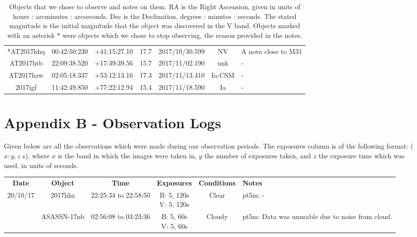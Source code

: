 \documentclass[twocolumn]{revtex4}
\begin{document}
{\begin{table}[h!]
\begin{tabularx}{\textwidth}{c c c c @{\hskip 5pt} c c X}
    *AT2017hhq & 00:42:50.230 & +41:15:27.10 & 17.7 & 2017/10/30.599 & NV & {A nova close to M31}  \\
    AT2017htb & 22:09:38.520 & +17:39:39.56 & 15.7 & 2017/11/02.190 & unk & {-}  \\
    AT2017hzw & 02:05:18.337 & +53:12:13.16 & 17.3 & 2017/11/13.410 & Ia-CSM & {-}  \\
    2017igf & 11:42:49.850 & +77:22:12.94 & 15.4 & 2017/11/18.590 & Ia & {-}  \\
    \hline      
\end{tabularx}
\caption{Objects that we chose to observe and notes on them. RA is the Right Ascension, given in units of hours : arcminutes : arcseconds. Dec is the Declination, degrees : minutes : seconds. The stated magnitude is the initial magnitude that the object was discovered in the V band. Objects marked with an asterisk $*$ were objects which we chose to stop observing, the reason provided in the notes.}
\label{objects}
\end{table}


\clearpage

\onecolumngrid
\vspace{-3ex}
\section*{Appendix B - Observation Logs} \label{obslogs}
\vspace{-2ex}
Given below are all the observations which were made during our observation periods. The exposures column is of the following format: ($x: y, z$ s), where $x$ is the band in which the images were taken in, $y$ the number of exposures taken, and $z$ the exposure time which was used, in units of seconds.
{\renewcommand{\arraystretch}{1.2}%
\begin{table}[h!]
\centering    
\begin{tabularx}{\textwidth}{c@{\hskip 5pt} c c@{\hskip 5pt} c@{\hskip 5pt} c@{\hskip 5pt} X}
    \hline
    \textbf{Date} & \textbf{Object} & \textbf{Time} & \textbf{Exposures} & \textbf{  Conditions  } & \textbf{Notes} \\ 
    20/10/17 & 2017hhz & 22:25:34 to 22:58:50 & \makecell{B: 5, 120s \\ V: 5, 120s} & {Clear} & {pt5m: -}  \\
    	& ASASSN-17nb &  02:56:08 to 03:23:36 & \makecell{B: 5, 60s \\ V: 5, 60s} & {Cloudy} & {pt5m: Data was unusable due to noise from cloud.} \\      
	

\end{tabularx}
\end{table}}}
\end{document}
